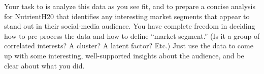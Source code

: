 \documentclass[11pt]{article}
\begin{document}
Your task to is analyze this data as you see fit, and to prepare a concise analysis for NutrientH20 that identifies any interesting market segments that appear to stand out in their social-media audience.  You have complete freedom in deciding how to pre-process the data and how to define ``market segment.'' (Is it a group of correlated interests?  A cluster?  A latent factor?  Etc.)  Just use the data to come up with some interesting, well-supported insights about the audience, and be clear about what you did.
\end{document}

